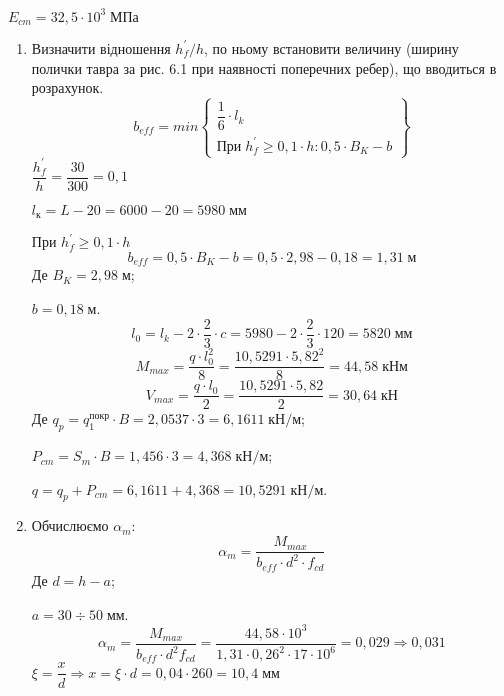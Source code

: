 \documentclass[a4paper,14pt]{article}
\begin{document}
$E_{cm} = 32,5 \cdot 10^3\;\textit{МПа}$
\begin{enumerate}
    \item Визначити відношення $h_f^\prime/h$, по ньому встановити величину   (ширину полички тавра за рис. 6.1 при наявності поперечних ребер), що вводиться в розрахунок.
        \begin{equation}
            b_{eff} = min\begin{Bmatrix}
                \dfrac{1}{6} \cdot l_k \\
                \textit{При}\;h_f^\prime \geq 0,1 \cdot h : 0,5 \cdot B_K - b
            \end{Bmatrix}
        \end{equation}
        $\dfrac{h_f^\prime}{h} = \dfrac{30}{300} = 0,1$

        $l_{\textit{к}} = L - 20 = 6000 - 20 = 5980\;\textit{мм}$

        При $h_f^\prime \geq 0,1 \cdot h$
        $$b_{eff} = 0,5 \cdot B_K - b = 0,5 \cdot 2,98 - 0,18 = 1,31\;\textit{м}$$
        Де $B_K = 2,98\;\textit{м}$;

        $b = 0,18\;\textit{м}$.
        $$l_0 = l_k - 2 \cdot \dfrac{2}{3} \cdot c = 5980 - 2 \cdot \dfrac{2}{3} \cdot 120 = 5820\;\textit{мм}$$
        $$M_{max} = \dfrac{q \cdot l_0^2}{8} = \dfrac{10,5291 \cdot 5,82^2}{8} = 44,58\;\textit{кНм}$$
        $$V_{max} = \dfrac{q \cdot l_0}{2} = \dfrac{10,5291 \cdot 5,82}{2} = 30,64\;\textit{кН}$$
        Де $q_p = q_1^{\textit{покр}} \cdot B = 2,0537 \cdot 3 = 6,1611\;\textit{кН/м}$;

        $P_{cm} = S_m \cdot B = 1,456 \cdot 3 = 4,368\;\textit{кН/м}$;

        $q = q_p + P_{cm} = 6,1611 + 4,368 = 10,5291\;\textit{кН/м}$.
    \item Обчислюємо $\alpha_m$:
        \begin{equation}
            \alpha_m = \dfrac{M_{max}}{b_{eff} \cdot d^2 \cdot f_{cd}}
        \end{equation}
        Де $d = h - a$;

        $a = 30 \div 50\;\textit{мм}$.
        $$\alpha_m = \dfrac{M_{max}}{b_{eff} \cdot d^2f_{cd}} = \dfrac{44,58 \cdot 10^3}{1,31 \cdot 0,26^2 \cdot 17 \cdot 10^6} = 0,029 \Longrightarrow 0,031$$
        $\xi = \dfrac{x}{d} \Longrightarrow x = \xi \cdot d = 0,04 \cdot 260 = 10,4\;\textit{мм}$


\end{enumerate}
\end{document}
